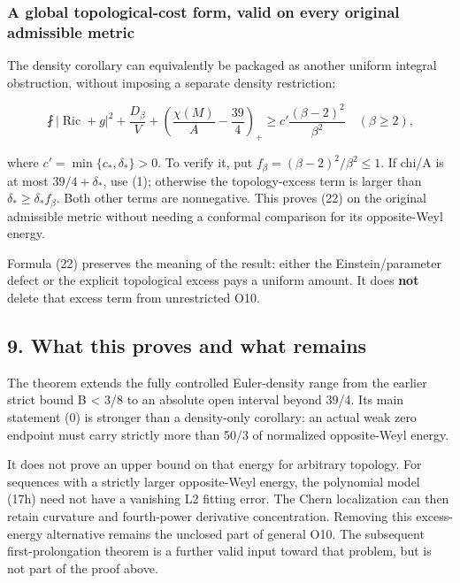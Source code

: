 \hypertarget{o10strength:a-global-topological-cost-form-valid-on-every-original-admissible-metric}{%
\subsubsection{A global topological-cost form, valid on every original
admissible
metric}\label{o10strength:a-global-topological-cost-form-valid-on-every-original-admissible-metric}}

The density corollary can equivalently be packaged as another uniform
integral obstruction, without imposing a separate density restriction:

\[
 \boxed{\fint|\operatorname{Ric}+g|^2+\frac{D_\beta}V
 +\left(\frac{\chi(M)}A-\frac{39}{4}\right)_+
 \ge c'\frac{(\beta-2)^2}{\beta^2}\quad(\beta\ge2),}
\tag{22}
\]

where \(c'=\min\{c_*,\delta_*\}>0\). To verify it, put
\(f_\beta=(\beta-2)^2/\beta^2\le1\). If chi/A is at most
\(39/4+\delta_*\), use (1); otherwise the topology-excess term is larger
than \(\delta_*\ge\delta_* f_\beta\). Both other terms are nonnegative.
This proves (22) on the original admissible metric without needing a
conformal comparison for its opposite-Weyl energy.

Formula (22) preserves the meaning of the result: either the
Einstein/parameter defect or the explicit topological excess pays a
uniform amount. It does \textbf{not} delete that excess term from
unrestricted O10.

\hypertarget{o10strength:what-this-proves-and-what-remains}{%
\subsection{9. What this proves and what
remains}\label{o10strength:what-this-proves-and-what-remains}}

The theorem extends the fully controlled Euler-density range from the
earlier strict bound B \textless{} 3/8 to an absolute open interval
beyond 39/4. Its main statement (0) is stronger than a density-only
corollary: an actual weak zero endpoint must carry strictly more than
50/3 of normalized opposite-Weyl energy.

It does not prove an upper bound on that energy for arbitrary topology.
For sequences with a strictly larger opposite-Weyl energy, the
polynomial model (17h) need not have a vanishing L2 fitting error. The
Chern localization can then retain curvature and fourth-power derivative
concentration. Removing this excess-energy alternative remains the
unclosed part of general O10. The subsequent first-prolongation theorem
is a further valid input toward that problem, but is not part of the
proof above.
